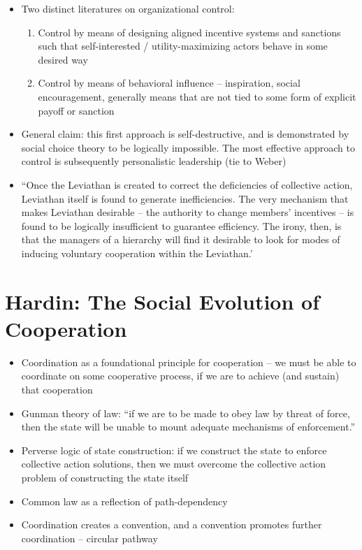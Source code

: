 \documentclass[12pt]{article}
\begin{document}
\begin{itemize}
    \item Two distinct literatures on organizational control:
    \begin{enumerate}
        \item Control by means of designing aligned incentive systems and sanctions such that self-interested / utility-maximizing actors behave in some desired way
        \item Control by means of behavioral influence -- inspiration, social encouragement, generally means that are not tied to some form of explicit payoff or sanction
    \end{enumerate}
    \item General claim: this first approach is self-destructive, and is demonstrated by social choice theory to be logically impossible. The most effective approach to control is subsequently personalistic leadership (tie to Weber)
    \item ``Once the Leviathan is created to correct the deficiencies of collective action, Leviathan itself is found to generate inefficiencies. The very mechanism that makes Leviathan desirable -- the authority to change members' incentives -- is found to be logically insufficient to guarantee efficiency. The irony, then, is that the managers of a hierarchy will find it desirable to look for modes of inducing voluntary cooperation within the Leviathan.'
\end{itemize}


\section{Hardin: The Social Evolution of Cooperation}

\begin{itemize}
    \item Coordination as a foundational principle for cooperation -- we must be able to coordinate on some cooperative process, if we are to achieve (and sustain) that cooperation
    \item Gunman theory of law: ``if we are to be made to obey law by threat of force, then the state will be unable to mount adequate mechanisms of enforcement.''
    \item Perverse logic of state construction: if we construct the state to enforce collective action solutions, then we must overcome the collective action problem of constructing the state itself
    \item Common law as a reflection of path-dependency
    \item Coordination creates a convention, and a convention promotes further coordination -- circular pathway
\end{itemize}
\end{document}
